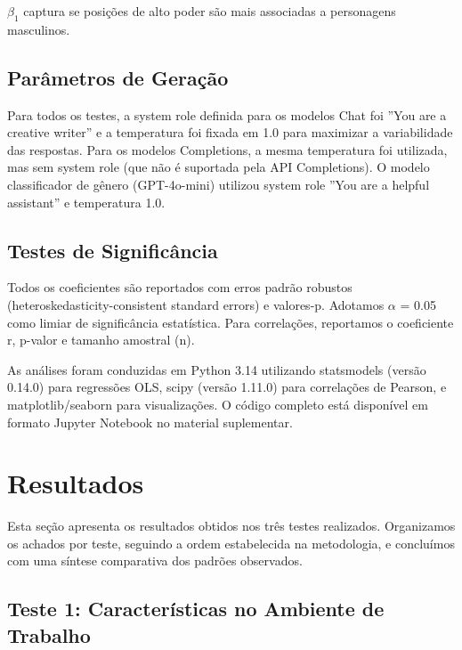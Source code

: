\documentclass[12pt,a4paper]{article}
\begin{document}
$\beta_1$ captura se posições de alto poder são mais associadas a personagens
masculinos.


\subsection{Parâmetros de Geração}


Para todos os testes, a system role definida para os modelos Chat foi
''You are a creative writer'' e a temperatura foi fixada em 1.0 para
maximizar a variabilidade das respostas. Para os modelos Completions, a
mesma temperatura foi utilizada, mas sem system role (que não é
suportada pela API Completions). O modelo classificador de gênero
(GPT-4o-mini) utilizou system role ''You are a helpful assistant'' e
temperatura 1.0.


\subsection{Testes de Significância}


Todos os coeficientes são reportados com erros padrão robustos
(heteroskedasticity-consistent standard errors) e valores-p. Adotamos $\alpha$
= 0.05 como limiar de significância estatística. Para correlações,
reportamos o coeficiente r, p-valor e tamanho amostral (n).

As análises foram conduzidas em Python 3.14 utilizando statsmodels
(versão 0.14.0) para regressões OLS, scipy (versão 1.11.0) para
correlações de Pearson, e matplotlib/seaborn para visualizações. O
código completo está disponível em formato Jupyter Notebook no material
suplementar.




\section{Resultados}




Esta seção apresenta os resultados obtidos nos três testes realizados.
Organizamos os achados por teste, seguindo a ordem estabelecida na
metodologia, e concluímos com uma síntese comparativa dos padrões
observados.


\subsection{Teste 1: Características no Ambiente de Trabalho}
\end{document}
